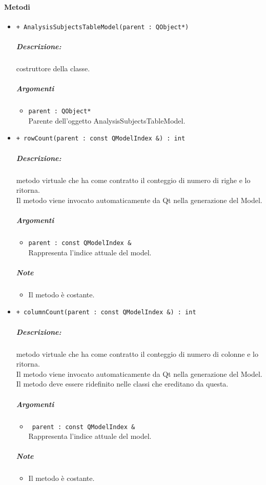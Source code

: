 \paragraph{\color{black}Metodi\\}
\begin{itemize}
	\item \color{blue}\verb!+ AnalysisSubjectsTableModel(parent : QObject*)!\\
		\color{black}
		\subparagraph{Descrizione:} costruttore della classe.\\
		\subparagraph{Argomenti}
			\begin{itemize}
				\item \color{RoyalPurple}\verb!parent : QObject*!\\
				\color{Black}Parente dell'oggetto AnalysisSubjectsTableModel.
			\end{itemize}
				
	\item \color{blue}\verb!+ rowCount(parent : const QModelIndex &) : int!\\
	\color{black}
	\subparagraph{Descrizione:} metodo virtuale che ha come contratto il conteggio di numero di righe e lo ritorna.
	\\Il metodo viene invocato automaticamente da Qt\g{} nella generazione del Model.\\
	\subparagraph{Argomenti}
		\begin{itemize}
			\item \color{RoyalPurple}\verb!parent : const QModelIndex &!\\
			\color{Black}Rappresenta l'indice attuale del model.
		\end{itemize}
	\subparagraph{Note}
			\begin{itemize}
				\item Il metodo è costante.
			\end{itemize}
	
	\item \color{blue}\verb!+ columnCount(parent : const QModelIndex &) : int!\\
	\color{black}
	\subparagraph{Descrizione:} metodo virtuale che ha come contratto il conteggio di numero di colonne e lo ritorna.\\
	Il metodo viene invocato automaticamente da Qt\g{} nella generazione del Model.\\
	Il metodo deve essere ridefinito nelle classi che ereditano da questa.\\
	\subparagraph{Argomenti}
		\begin{itemize}
			\item \color{RoyalPurple}\verb! parent : const QModelIndex &!\\
			\color{black}Rappresenta l'indice attuale del model.
		\end{itemize}
	\subparagraph{Note}
			\begin{itemize}
				\item Il metodo è costante.
			\end{itemize}
		

\end{itemize}
